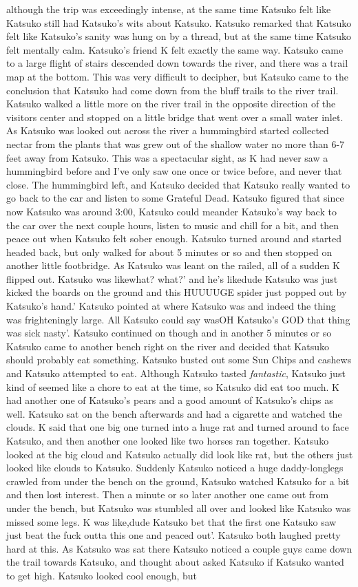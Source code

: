 \documentclass[12pt]{book}
\begin{document}
although the trip was exceedingly intense, at the same time Katsuko felt like Katsuko still had Katsuko's wits about Katsuko. Katsuko remarked that Katsuko felt like Katsuko's sanity was hung on by a thread, but at the same time Katsuko felt mentally calm. Katsuko's friend K felt exactly the same way. Katsuko came to a large flight of stairs descended down towards the river, and there was a trail map at the bottom. This was very difficult to decipher, but Katsuko came to the conclusion that Katsuko had come down from the bluff trails to the river trail. Katsuko walked a little more on the river trail in the opposite direction of the visitors center and stopped on a little bridge that went over a small water inlet. As Katsuko was looked out across the river a hummingbird started collected nectar from the plants that was grew out of the shallow water no more than 6-7 feet away from Katsuko. This was a spectacular sight, as K had never saw a hummingbird before and I've only saw one once or twice before, and never that close. The hummingbird left, and Katsuko decided that Katsuko really wanted to go back to the car and listen to some Grateful Dead. Katsuko figured that since now Katsuko was around 3:00, Katsuko could meander Katsuko's way back to the car over the next couple hours, listen to music and chill for a bit, and then peace out when Katsuko felt sober enough. Katsuko turned around and started headed back, but only walked for about 5 minutes or so and then stopped on another little footbridge. As Katsuko was leant on the railed, all of a sudden K flipped out. Katsuko was likewhat? what?' and he's likedude Katsuko was just kicked the boards on the ground and this HUUUUGE spider just popped out by Katsuko's hand.' Katsuko pointed at where Katsuko was and indeed the thing was frighteningly large. All Katsuko could say wasOH Katsuko's GOD that thing was sick nasty'. Katsuko continued on though and in another 5 minutes or so Katsuko came to another bench right on the river and decided that Katsuko should probably eat something. Katsuko busted out some Sun Chips and cashews and Katsuko attempted to eat. Although Katsuko tasted \emph{fantastic}, Katsuko just kind of seemed like a chore to eat at the time, so Katsuko did eat too much. K had another one of Katsuko's pears and a good amount of Katsuko's chips as well. Katsuko sat on the bench afterwards and had a cigarette and watched the clouds. K said that one big one turned into a huge rat and turned around to face Katsuko, and then another one looked like two horses ran together. Katsuko looked at the big cloud and Katsuko actually did look like rat, but the others just looked like clouds to Katsuko. Suddenly Katsuko noticed a huge daddy-longlegs crawled from under the bench on the ground, Katsuko watched Katsuko for a bit and then lost interest. Then a minute or so later another one came out from under the bench, but Katsuko was stumbled all over and looked like Katsuko was missed some legs. K was like,dude Katsuko bet that the first one Katsuko saw just beat the fuck outta this one and peaced out'. Katsuko both laughed pretty hard at this. As Katsuko was sat there Katsuko noticed a couple guys came down the trail towards Katsuko, and thought about asked Katsuko if Katsuko wanted to get high. Katsuko looked cool enough, but 
\end{document}
